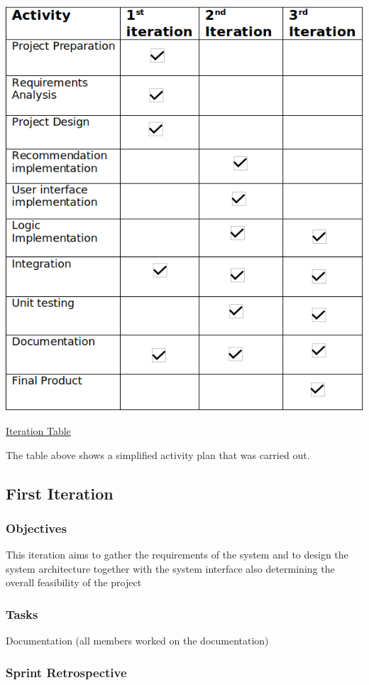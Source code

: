 \documentclass[10pt]{article}
\begin{document}
\begin{center}
\includegraphics[width=.9\textwidth]{activity.png}
\end{center}
\caption{\underline{Iteration Table}}
The table above shows a simplified activity plan that was carried out. 

\subsection{First Iteration}

\subsubsection{Objectives}

This iteration aims to gather the requirements of the system and to design the system architecture together with the system interface also determining the overall feasibility of the project

\subsubsection{Tasks}

Documentation (all members worked on the documentation)

\subsubsection{Sprint Retrospective}
\end{document}
